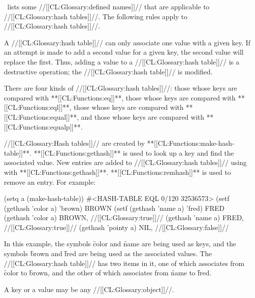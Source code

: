 


\Thenextfigure\ lists some //[[CL:Glossary:defined names]]// that are applicable 
to //[[CL:Glossary:hash tables]]//.  The following rules apply to //[[CL:Glossary:hash tables]]//.



\beginlist
\itemitem{--}
A //[[CL:Glossary:hash table]]// can only associate one value with a given
key. If an attempt is made to add a second value for a given key,
the second value will replace the first.
Thus, adding a value to a //[[CL:Glossary:hash table]]// is a destructive operation;
the //[[CL:Glossary:hash table]]// is modified.  


\itemitem{--}
There are four kinds of //[[CL:Glossary:hash tables]]//:
  those whose keys are compared with **[[CL:Functions:eq]]**,
  those whose keys are compared with **[[CL:Functions:eql]]**,
  those whose keys are compared with **[[CL:Functions:equal]]**, and
  those whose keys are compared with **[[CL:Functions:equalp]]**.  



\itemitem{--}
//[[CL:Glossary:Hash tables]]// are created by **[[CL:Functions:make-hash-table]]**. 
**[[CL:Functions:gethash]]** is used to look up a key and find the associated value.
New entries are added to //[[CL:Glossary:hash tables]]// using  with **[[CL:Functions:gethash]]**.
**[[CL:Functions:remhash]]** is used to remove an entry.
For example:

\code
 (setq a (make-hash-table)) \EV #<HASH-TABLE EQL 0/120 32536573>
 (setf (gethash 'color a) 'brown) \EV BROWN
 (setf (gethash 'name a) 'fred) \EV FRED
 (gethash 'color a) \EV BROWN, //[[CL:Glossary:true]]//
 (gethash 'name a) \EV FRED, //[[CL:Glossary:true]]//
 (gethash 'pointy a) \EV NIL, //[[CL:Glossary:false]]//
\endcode


In this example, the symbols \f{color} and \f{name} are being used as
keys, and the symbols \f{brown} and \f{fred} are being used as the
associated values.  The //[[CL:Glossary:hash table]]// 
has two items in it, one of which                              
associates from \f{color} to \f{brown}, and the other of which
associates from \f{name} to \f{fred}.


\itemitem{--}
A key or a value may be any //[[CL:Glossary:object]]//.


















